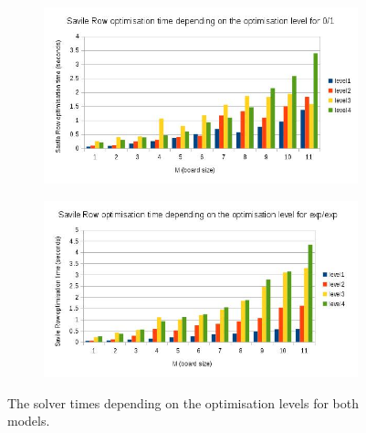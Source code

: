 \documentclass{report}
\begin{document}
\begin{figure}
\begin{subfigure}{.5\textwidth}
\hspace{-4cm}
\includegraphics[scale=0.47]{images/optim_p1_srTime.jpg}
  \label{fig:sub1}
\end{subfigure}%
\begin{subfigure}{.5\textwidth}
\hspace{1cm}
\includegraphics[scale=0.47]{images/optim_p2_srTime.jpg}
  \label{fig:sub2}
\end{subfigure}
\caption{The solver times depending on the optimisation levels for both models.}
\label{fig:test}
\end{figure}
\end{document}
